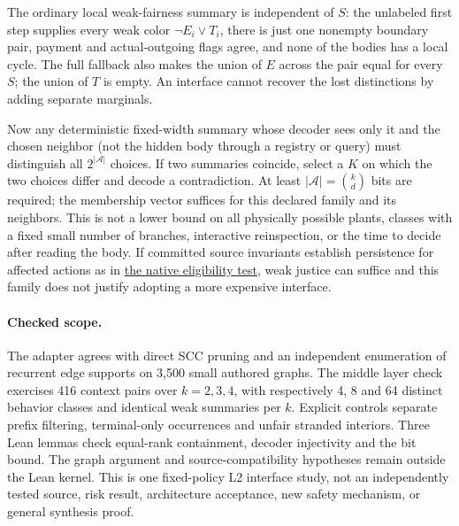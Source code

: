 \documentclass{article}
\begin{document}
The ordinary local weak-fairness summary is independent of \(S\):
the unlabeled first step supplies every weak color
\(\neg E_i\lor T_i\), there is just one nonempty boundary pair, payment
and actual-outgoing flags agree, and none of the bodies has a local
cycle. The full fallback also makes the union of \(E\) across the
pair equal for every \(S\); the union of \(T\) is empty. An interface
cannot recover the lost distinctions by adding separate marginals.

Now any deterministic fixed-width summary whose decoder sees only
it and the chosen neighbor (not the hidden body through a registry or
query) must distinguish all \(2^{|\mathcal A|}\) choices. If two summaries
coincide, select a \(K\) on which the two choices differ and decode a
contradiction. At least \(|\mathcal A|=\binom{k}{d}\) bits are required;
the membership vector suffices for this declared family and its
neighbors. This is not a lower bound on all physically possible
plants, classes with a fixed small number of branches, interactive
reinspection, or the time to decide after reading the body.
If committed source invariants establish persistence for affected
actions as in
\href{https://github.com/eternal-november/eos-research-programmes/pull/618}{the
native eligibility test}, weak justice can suffice and this family
does not justify adopting a more expensive interface.

\paragraph{Checked scope.}
The adapter agrees with direct SCC pruning and an independent
enumeration of recurrent edge supports on 3,500 small authored graphs.
The middle layer check exercises 416 context pairs over \(k=2,3,4\),
with respectively 4, 8 and 64 distinct behavior classes and identical
weak summaries per \(k\). Explicit controls separate prefix filtering,
terminal-only occurrences and unfair stranded interiors. Three Lean
lemmas check equal-rank containment, decoder injectivity and the bit
bound. The graph argument and source-compatibility hypotheses remain
outside the Lean kernel. This is one fixed-policy L2 interface study,
not an independently tested source, risk result, architecture acceptance,
new safety mechanism, or general synthesis proof.
\end{document}
